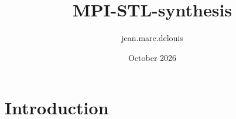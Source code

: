 \documentclass{article}
\title{MPI-STL-synthesis}
\author{jean.marc.delouis }
\date{October 2026}
\begin{document}
\maketitle

\section{Introduction}
\end{document}
